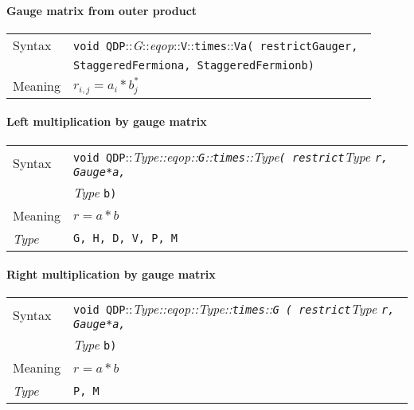 \documentclass[12pt,letterpaper]{article}
\newcommand{\tColorMatrix}{Gauge}
\newcommand{\tStaggeredFermion}{StaggeredFermion}
\newcommand{\namespace}{QDP}
\newcommand{\ttdash}{{::}}
\newcommand{\itt}{\it Type}
\newcommand{\extraarg}{}
\begin{document}
\paragraph{Gauge matrix from outer product}

\begin{flushleft}
  \begin{tabular}{|l|l|}
  \hline
  Syntax      & {\tt void \namespace}\ttdash{\it G}\ttdash{\it eqop}\ttdash{\tt V}\ttdash{\tt times}\ttdash{\tt Va( restrict}{\tt \tColorMatrix }{\tt *r, }\\
              & {\tt \tStaggeredFermion }{\tt *a, }{\tt \tStaggeredFermion }{\tt *b\extraarg)} \\
  \hline
  Meaning     & $r_{i,j} = a_i * b_j^*$ \\
  \hline
  \end{tabular}
\end{flushleft}

\paragraph{Left multiplication by gauge matrix}

\begin{flushleft}
  \begin{tabular}{|l|l|}
  \hline
  Syntax      & {\tt void \namespace}\ttdash\itt\ttdash{\it eqop}\ttdash{\tt G}\ttdash{\tt times}\ttdash\itt{\tt ( restrict}{\it Type }{\tt *r, \tColorMatrix *a, }\\
              & {\it Type }{\tt *b\extraarg)} \\
  \hline
  Meaning     & $r = a * b$ \\
  \hline
  \itt        & {\tt G, H, D, V, P, M} \\
  \hline
  \end{tabular}
\end{flushleft}


\paragraph{Right multiplication by gauge matrix}

\begin{flushleft}
  \begin{tabular}{|l|l|}
  \hline
  Syntax      & {\tt void \namespace}\ttdash\itt\ttdash{\it eqop}\ttdash\itt\ttdash{\tt times}\ttdash{\tt G ( restrict}{\it Type }{\tt *r, \tColorMatrix *a, }\\
              & {\it Type }{\tt *b\extraarg)} \\
  \hline
  Meaning     & $r = a * b$ \\
  \hline
  \itt        & {\tt P, M} \\
  \hline
  \end{tabular}
\end{flushleft}
\end{document}
